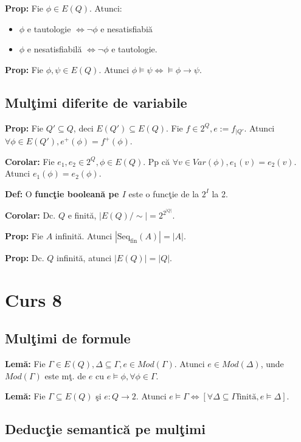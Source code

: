 \documentclass{article}
\begin{document}
\textbf{Prop:} Fie $\phi\in E(Q)$. Atunci:
\begin{itemize}
    \item $\phi$ e tautologie $\iff \neg\phi$ e nesatisfiabi\u a
    \item $\phi$ e nesatisfiabil\u a $\iff \neg\phi$ e tautologie.
\end{itemize}

\textbf{Prop:} Fie $\phi,\psi\in E(Q)$. Atunci $\phi\models\psi \iff \models\phi\rightarrow\psi$.

\subsection{Mul\c timi diferite de variabile}

\textbf{Prop:} Fie $Q'\subseteq Q$, deci $E(Q')\subseteq E(Q)$. Fie $f\in 2^Q,e:=f_{|Q'}$. Atunci $\forall \phi\in E(Q'),e^+(\phi)=f^+(\phi)$.

\textbf{Corolar:} Fie $e_1,e_2\in 2^Q,\phi\in E(Q)$. Pp c\u a $\forall v\in Var(\phi),e_1(v)=e_2(v)$. Atunci $e_1(\phi)=e_2(\phi)$.

\textbf{Def:} O \textbf{func\c tie boolean\u a pe $I$} este o func\c tie de la $2^I$ la 2.

\textbf{Corolar:} Dc. $Q$ e finit\u a, $|E(Q)/\sim|=2^{2^{|Q|}}$. 

\textbf{Prop:} Fie $A$ infinit\u a. Atunci $|\text{Seq}_\text{fin}(A)|=|A|$.

\textbf{Prop:} Dc. $Q$ infinit\u a, atunci $|E(Q)|=|Q|$.

\section{Curs 8}

\subsection{Mul\c timi de formule}

\textbf{Lem\u a:} Fie $\Gamma \in E(Q),\Delta\subseteq \Gamma,e\in Mod(\Gamma).$ Atunci $e\in Mod(\Delta)$, unde $Mod(\Gamma)$ este m\c t. de $e$ cu $e\models\phi,\forall\phi\in\Gamma $.

\textbf{Lem\u a:} Fie $\Gamma\subseteq E(Q)$ \c si $e:Q\rightarrow 2$. Atunci $e\models\Gamma \iff [\forall \Delta\subseteq\Gamma\text{finit\u a}, e\models\Delta]$.

\subsection{Deduc\c tie semantic\u a pe mul\c timi}
\end{document}
